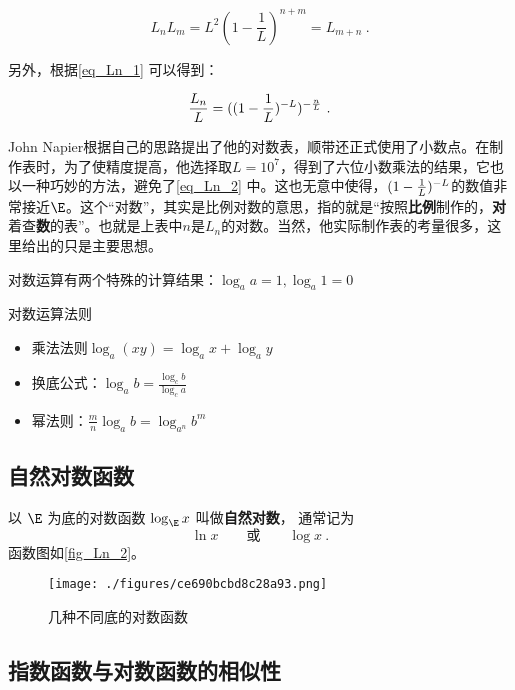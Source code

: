 \begin{equation}\label{eq_Ln_2}
L_nL_m=L^2(1 - \frac{1}{L})^{n+m}=L_{m+n}~.
\end{equation}

另外，根据\autoref{eq_Ln_1} 可以得到：

\begin{equation}
{L_n\over L}=((1-{1\over L})^{-L})^{-{n\over L}}~.
\end{equation}

John Napier根据自己的思路提出了他的对数表，顺带还正式使用了小数点。在制作表时，为了使精度提高，他选择取$L=10^7$，得到了六位小数乘法的结果，它也以一种巧妙的方法，避免了\autoref{eq_Ln_2} 中。这也无意中使得，$(1-{1\over L})^{-L}$的数值非常接近$\E$。这个“对数”，其实是比例对数的意思，指的就是“按照\textbf{比例}制作的，\textbf{对}着查\textbf{数}的表”。也就是上表中$n$是$L_n$的对数。当然，他实际制作表的考量很多，这里给出的只是主要思想。


对数运算有两个特殊的计算结果：$\log_a a=1,\log_a1=0$

\begin{theorem}{对数运算法则}
\begin{itemize}
\item 乘法法则$\log_a(xy)=\log_ax+\log_ay$
\item 换底公式：$\displaystyle \log_a b=\frac{\log_cb}{\log_ca}$
\item 幂法则：$\displaystyle \frac{m}{n}\log_a b=\log_{a^n} b^m$
\end{itemize}
\end{theorem}

\subsection{自然对数函数}
以 $\E$ 为底的对数函数 $\log_{\E} x$ 叫做\textbf{自然对数}， 通常记为
\begin{equation}
\ln x \qquad \text{或} \qquad \log x~.
\end{equation}
函数图如\autoref{fig_Ln_2}。
\begin{figure}[ht]
\centering
\texttt{[image: ./figures/ce690bcbd8c28a93.png]}
\caption{几种不同底的对数函数} \label{fig_Ln_2}
\end{figure}


\subsection{指数函数与对数函数的相似性}


